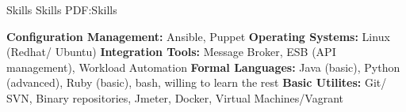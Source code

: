 \documentclass[letterpaper,MMMyyyy,nonstopmode]{simpleresumecv}
\begin{document}
\begin{Body}

\Section
{Skills}
{Skills}
{PDF:Skills}


\Entry
\textbf{Configuration Management:}
Ansible, Puppet
\Entry
\textbf{Operating Systems:}
Linux (Redhat/ Ubuntu)
\Entry
\textbf{Integration Tools:}
Message Broker, ESB (API management), Workload Automation 
\Entry
\textbf{Formal Languages:}
Java (basic), Python (advanced), Ruby (basic), bash, willing to learn the rest
\Entry
\textbf{Basic Utilites:}
Git/ SVN, Binary repositories, Jmeter, Docker, Virtual Machines/Vagrant
\end{Body}
\end{document}
